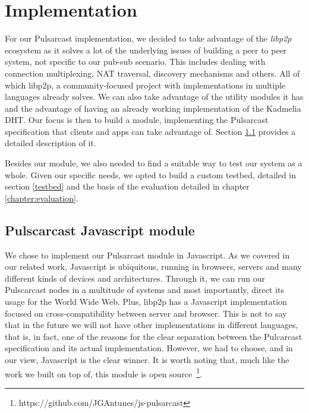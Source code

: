 
\chapter{Implementation}
\label{chapter:implementation}

For our Pulsarcast implementation, we decided to take advantage of the
\emph{libp2p} ecosystem as it solves a lot of the underlying issues of building
a peer to peer system, not specific to our pub-sub scenario. This includes
dealing with connection multiplexing, NAT traversal, discovery mechanisms and
others.  All of which libp2p, a community-focused project with implementations
in multiple languages already solves. We can also take advantage of the utility
modules it has and the advantage of having an already working implementation of
the Kadmelia DHT. Our focus is then to build a module, implementing the
Pulsarcast specification that clients and apps can take advantage of. Section
\ref{pulsarcast-javascript-module} provides a detailed description of it.

Besides our module, we also needed to find a suitable way to test our system as
a whole. Given our specific needs, we opted to build a custom testbed, detailed
in section \ref{testbed} and the basis of the evaluation detailed in chapter
\ref{chapter:evaluation}. 

\section{Pulscarcast Javascript module}\label{pulsarcast-javascript-module}

We chose to implement our Pulsarcast module in Javascript. As we covered in our
related work, Javascript is ubiquitous, running in browsers, servers and many
different kinds of devices and architectures. Through it, we can run our
Pulscarcast nodes in a multitude of systems and most importantly, direct its
usage for the World Wide Web. Plus, libp2p has a Javascript implementation
focused on cross-compatibility between server and browser. This is not to say
that in the future we will not have other implementations in different
languages, that is, in fact, one of the reasons for the clear separation
between the Pulcarcast specification and its actual implementation.  However,
we had to choose, and in our view, Javascript is the clear winner. It is worth
noting that, much like the work we built on top of, this module is open
source~\footnote{https://github.com/JGAntunes/js-pulsarcast}.

